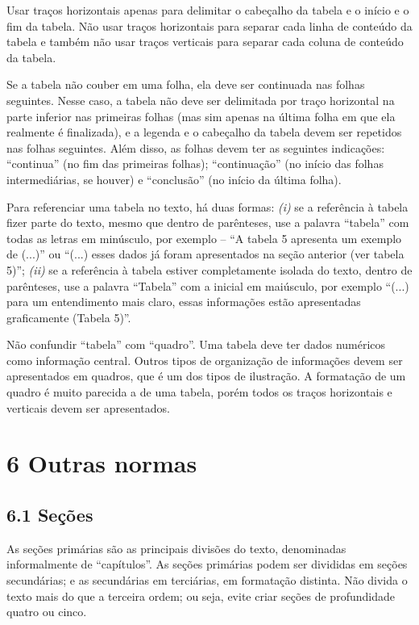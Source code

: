 \documentclass[
	12pt,				%
	oneside,			%
	a4paper,			%
	english,			%
	brazil				%
	]{abntex2ppgsi}
\begin{document}
\begin{anexosenv}
Usar traços horizontais apenas para delimitar o cabeçalho da tabela e o início e o fim da tabela. Não usar traços horizontais para separar cada linha de conteúdo da tabela e também não usar traços verticais para separar cada coluna de conteúdo da tabela. 

Se a tabela não couber em uma folha, ela deve ser continuada nas folhas seguintes. Nesse caso, a tabela não deve ser delimitada por traço horizontal na parte inferior nas primeiras folhas (mas sim apenas na última folha em que ela realmente é finalizada), e a legenda e o cabeçalho da tabela devem ser repetidos nas folhas seguintes. Além disso, as folhas devem ter as seguintes indicações: ``continua'' (no fim das primeiras folhas); ``continuação'' (no início das folhas intermediárias, se houver) e ``conclusão'' (no início da última folha).

Para referenciar uma tabela no texto, há duas formas: \textit{(i)} se a referência à tabela fizer parte do texto, mesmo que dentro de parênteses, use a palavra ``tabela'' com todas as letras em minúsculo, por exemplo – ``A tabela 5 apresenta um exemplo de (...)'' ou ``(...) esses dados já foram apresentados na seção anterior (ver tabela 5)''; \textit{(ii)} se a referência à tabela estiver completamente isolada do texto, dentro de parênteses, use a palavra ``Tabela'' com a inicial em maiúsculo, por exemplo ``(...) para um entendimento mais claro, essas informações estão apresentadas graficamente (Tabela 5)''.

Não confundir ``tabela'' com ``quadro''. Uma tabela deve ter dados numéricos como informação central. Outros tipos de organização de informações devem ser apresentados em quadros, que é um dos tipos de ilustração. A formatação de um quadro é muito parecida a de uma tabela, porém todos os traços horizontais e verticais devem ser apresentados.

\section*{6 Outras normas}

\subsection*{6.1 Seções}

As seções primárias são as principais divisões do texto, denominadas informalmente de ``capítulos''. As seções primárias podem ser divididas em seções secundárias; e as secundárias em terciárias, em formatação distinta. Não divida o texto mais do que a terceira ordem; ou seja, evite criar seções de profundidade quatro ou cinco.


\end{anexosenv}
\end{document}
